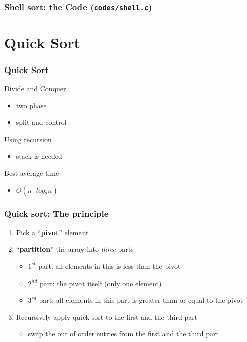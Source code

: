 \documentclass[newPxFont,sthlmFooter,nooffset]{beamer}
\begin{document}
\begin{frame}[t, fragile]
  \frametitle{Shell sort: the Code (\texttt{codes/shell.c})}
  


\end{frame}


\section{Quick Sort}



\begin{frame}[t, fragile]
  \frametitle{Quick Sort}
Divide and Conquer
\begin{itemize}
\item two phase
\item split and control
\end{itemize}

Using recursion
\begin{itemize}
\item stack is needed
\end{itemize}

Best average time
\begin{itemize}
\item $O(n\cdot log_2n)$
\end{itemize}
\end{frame}


\begin{frame}[t, fragile]
  \frametitle{Quick sort: The principle}
  \begin{enumerate}
  \item Pick a ``\textbf{pivot}'' element
  \item ``\textbf{partition}'' the array into \textit{three} parts
    \begin{itemize}
    \item $1^{st}$ part: all elements in this is less than the pivot
    \item $2^{nd}$ part: the pivot itself (only one element)
    \item $3^{rd}$ part: all elements in this part is greater than or equal to the pivot
    \end{itemize}
  \item Recursively apply quick sort to the first and the third part
    \begin{itemize}
    \item swap the out of order entries from the first and the third part
    \end{itemize}
  \end{enumerate}


\end{frame}
\end{document}
